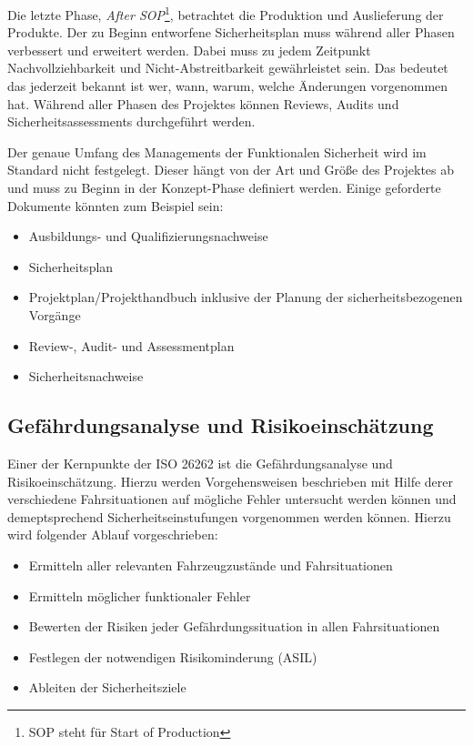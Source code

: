 \documentclass[
  a4paper,					    %
  twoside,
  DIV=calc,     				%
  bibliography=totoc,
  cleardoublepage=empty,
  ngerman,     					%
  final       					%
]{scrbook}
\begin{document}
Die letzte Phase, \emph{After SOP}\footnote{SOP steht für Start of Production}, betrachtet die Produktion und Auslieferung der Produkte. Der zu Beginn entworfene Sicherheitsplan muss während aller Phasen verbessert und erweitert werden. Dabei muss zu jedem Zeitpunkt Nachvollziehbarkeit und Nicht-Abstreitbarkeit gewährleistet sein. Das bedeutet das jederzeit bekannt ist wer, wann, warum, welche Änderungen vorgenommen hat. Während aller Phasen des Projektes können Reviews, Audits und Sicherheitsassessments durchgeführt werden.

Der genaue Umfang des Managements der Funktionalen Sicherheit wird im Standard nicht festgelegt. Dieser hängt von der Art und Größe des Projektes ab und muss zu Beginn in der Konzept-Phase definiert werden. Einige geforderte Dokumente könnten zum Beispiel sein:

\begin{itemize}
    \item Ausbildungs- und Qualifizierungsnachweise
    \item Sicherheitsplan
    \item Projektplan/Projekthandbuch inklusive der Planung der sicherheitsbezogenen Vorgänge
    \item Review-, Audit- und Assessmentplan
    \item Sicherheitsnachweise
\end{itemize}

\subsection{Gefährdungsanalyse und Risikoeinschätzung}
\label{sec:ISO26262_GundR}
Einer der Kernpunkte der ISO 26262 ist die Gefährdungsanalyse und Risikoeinschätzung. Hierzu werden Vorgehensweisen beschrieben mit Hilfe derer verschiedene Fahrsituationen auf mögliche Fehler untersucht werden können und demeptsprechend Sicherheitseinstufungen vorgenommen werden können. Hierzu wird folgender Ablauf vorgeschrieben:

\begin{itemize}
    \item Ermitteln aller relevanten Fahrzeugzustände und Fahrsituationen
    \item Ermitteln möglicher funktionaler Fehler
    \item Bewerten der Risiken jeder Gefährdungssituation in allen Fahrsituationen
    \item Festlegen der notwendigen Risikominderung (ASIL)
    \item Ableiten der Sicherheitsziele
\end{itemize}
\end{document}
